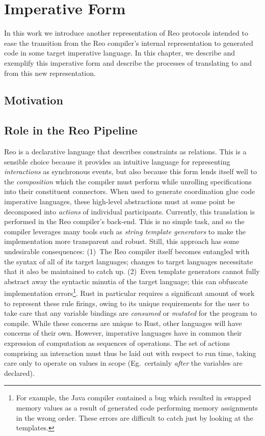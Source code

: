 \chapter{Imperative Form}
\label{sec:imperative_form}
In this work we introduce another representation of Reo protocols intended to ease the transition from the Reo compiler's internal representation to generated code in some target imperative language. In this chapter, we describe and exemplify this imperative form and describe the processes of translating to and from this new representation. 


\section{Motivation}

\section{Role in the Reo Pipeline}
Reo is a declarative language that describes constraints as relations. This is a sensible choice because it provides an intuitive language for representing \textit{interactions} as synchronous events, but also because this form lends itself well to the \textit{composition} which the compiler must perform while unrolling specifications into their constituent connectors. When used to generate coordination glue code imperative languages, these high-level abstractions must at some point be decomposed into \textit{actions} of individual participants. Currently, this translation is performed in the Reo compiler's back-end. This is no simple task, and so the compiler leverages many tools such as \textit{string template generators} to make the implementation more transparent and robust. Still, this approach has some undesirable consequences: (1)~The Reo compiler itself becomes entangled with the syntax of all of its target languages; changes to target languages necessitate that it also be maintained to catch up. (2)~Even template generators cannot fully abstract away the syntactic minutia of the target language; this can obfuscate implementation errors\footnote{For example, the Java compiler contained a bug which resulted in swapped memory values as a result of generated code performing memory assignments in the wrong order. These errors are difficult to catch just by looking at the templates.}. Rust in particular requires a significant amount of work to represent these rule firings, owing to its unique requirements for the user to take care that any variable bindings are \textit{consumed} or \textit{mutated} for the program to compile. While these concerns are unique to Rust, other languages will have concerns of their own. However, imperative languages have in common their expression of computation as sequences of operations. The set of actions comprising an interaction must thus be laid out with respect to run time, taking care only to operate on values in scope (Eg.\ certainly \textit{after} the variables are declared). 

